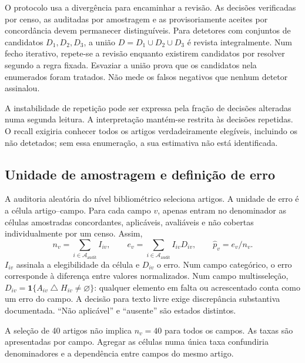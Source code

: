 O protocolo usa a divergência para encaminhar a revisão. As decisões verificadas por censo, as auditadas por amostragem e as provisoriamente aceites por concordância devem permanecer distinguíveis. Para detetores com conjuntos de candidatos $D_1,D_2,D_3$, a união $D=D_1\cup D_2\cup D_3$ é revista integralmente. Num fecho iterativo, repete-se a revisão enquanto existirem candidatos por resolver segundo a regra fixada. Esvaziar a união prova que os candidatos nela enumerados foram tratados. Não mede os falsos negativos que nenhum detetor assinalou.

A instabilidade de repetição pode ser expressa pela fração de decisões alteradas numa segunda leitura. A interpretação mantém-se restrita às decisões repetidas. O recall exigiria conhecer todos os artigos verdadeiramente elegíveis, incluindo os não detetados; sem essa enumeração, a sua estimativa não está identificada.

\subsection{Unidade de amostragem e definição de erro}
\label{sec:mat-auditoria-amostra}
A auditoria aleatória do nível bibliométrico seleciona artigos. A unidade de erro é a célula artigo--campo. Para cada campo $v$, apenas entram no denominador as células amostradas concordantes, aplicáveis, avaliáveis e não cobertas individualmente por um censo. Assim,
\begin{equation}
n_v=\sum_{i\in\mathcal A_{\mathrm{audit}}}I_{iv},
\qquad e_v=\sum_{i\in\mathcal A_{\mathrm{audit}}}I_{iv}D_{iv},
\qquad \widehat p_v=e_v/n_v.
\label{eq:mat-erro-auditoria}
\end{equation}
$I_{iv}$ assinala a elegibilidade da célula e $D_{iv}$ o erro. Num campo categórico, o erro corresponde à diferença entre valores normalizados. Num campo multisseleção, $D_{iv}=\mathbf1\{A_{iv}\mathbin\triangle H_{iv}\neq\varnothing\}$: qualquer elemento em falta ou acrescentado conta como um erro do campo. A decisão para texto livre exige discrepância substantiva documentada. ``Não aplicável'' e ``ausente'' são estados distintos.

A seleção de 40 artigos não implica $n_v=40$ para todos os campos. As taxas são apresentadas por campo. Agregar as células numa única taxa confundiria denominadores e a dependência entre campos do mesmo artigo.

